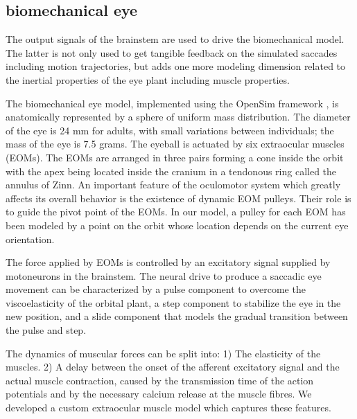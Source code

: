 \documentclass{frontiersSCNS}
\begin{document}

\subsection{biomechanical eye}

The output signals of the brainstem are used to drive the biomechanical model. The latter is not only used to get tangible feedback on the simulated saccades including motion trajectories, but adds one more modeling dimension related to the inertial properties of the eye plant including muscle properties.


The biomechanical eye model, implemented using the OpenSim framework
\cite{seth_opensim:_2011}, is anatomically represented by a sphere of
uniform mass distribution. The diameter of the eye is 24 mm for adults,
with small variations between individuals; the mass of the eye is 7.5 grams.
The eyeball is actuated by six extraocular muscles
(EOMs). The EOMs are arranged in three pairs forming a cone inside the
orbit with the apex being located inside the cranium in a tendonous
ring called the annulus of Zinn. An important feature of the
oculomotor system which greatly affects its overall behavior is the
existence of dynamic EOM pulleys. Their role is to guide the pivot
point of the EOMs. In our model, a pulley for each EOM has been
modeled by a point on the orbit whose location depends on the current
eye orientation.

The force applied by EOMs is controlled by an excitatory signal
supplied by motoneurons in the brainstem. The neural drive to produce a saccadic eye movement can be characterized by a pulse component to overcome the viscoelasticity of the orbital plant, a step component to stabilize the eye in the new position, and a slide component that models the gradual transition between the pulse and step.

The dynamics of muscular
forces can be split into: 1) The elasticity of the muscles. 2) A delay
between the onset of the afferent excitatory signal and the actual
muscle contraction, caused by the transmission time of the action
potentials and by the necessary calcium release at the muscle
fibres. We developed a custom extraocular muscle model which captures
these features.
\end{document}
